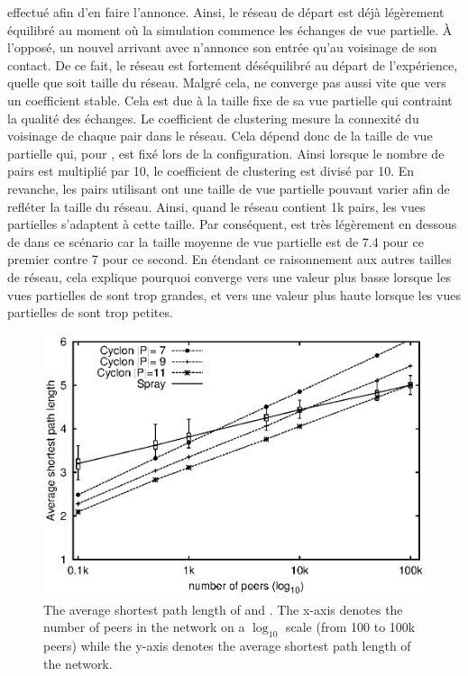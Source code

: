 \begin{asparadesc}
  effectué afin d'en faire l'annonce. Ainsi, le réseau de départ est déjà
  légèrement équilibré au moment où la simulation commence les échanges de vue
  partielle. À l'opposé, un nouvel arrivant avec \SPRAY n'annonce son entrée
  qu'au voisinage de son contact. De ce fait, le réseau est fortement
  déséquilibré au départ de l'expérience, quelle que soit taille du
  réseau. Malgré cela, \CYCLON ne converge pas aussi vite que \SPRAY vers un
  coefficient stable. Cela est due à la taille fixe de sa vue partielle qui
  contraint la qualité des échanges. Le coefficient de clustering mesure la
  connexité du voisinage de chaque pair dans le réseau. Cela dépend donc de la
  taille de vue partielle qui, pour \CYCLON, est fixé lors de la configuration.
  Ainsi lorsque le nombre de pairs est multiplié par 10, le coefficient de
  clustering est divisé par 10. En revanche, les pairs utilisant \SPRAY ont une
  taille de vue partielle pouvant varier afin de refléter la taille du réseau.
  Ainsi, quand le réseau contient 1k pairs, les vues partielles s'adaptent à
  cette taille. Par conséquent, \SPRAY est très légèrement en dessous de \CYCLON
  dans ce scénario car la taille moyenne de vue partielle est de 7.4 pour ce
  premier contre 7 pour ce second. En étendant ce raisonnement aux autres
  tailles de réseau, cela explique pourquoi \SPRAY converge vers une valeur plus
  basse lorsque les vues partielles de \CYCLON sont trop grandes, et vers une
  valeur plus haute lorsque les vues partielles de \CYCLON sont trop petites.
\end{asparadesc}

\begin{figure}
  \centering
  \includegraphics[width=.8\textwidth]{img/spray/avgpath.eps}
  \caption{\label{fig:spray:avgpath}The average shortest path length of \SPRAY
    and \CYCLON. The x-axis denotes the number of peers in the network on a
    $\log_{10}$ scale (from 100 to 100k peers) while the y-axis denotes the
    average shortest path length of the network.}
\end{figure}

